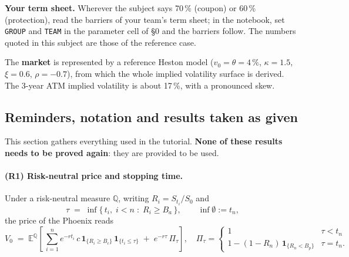 \documentclass[11pt,a4paper]{article}
\newcommand{\E}{\mathbb{E}^{\mathbb{Q}}}
\newcommand{\ind}[1]{\mathbf{1}_{\{#1\}}}
\begin{document}
\noindent\textbf{Your term sheet.} Wherever the subject says 70\,\% (coupon) or 60\,\% (protection), read the barriers
of your team's term sheet; in the notebook, set \texttt{GROUP} and \texttt{TEAM} in the parameter cell of \S0 and the
barriers follow. The numbers quoted in this subject are those of the reference case.

The \textbf{market} is represented by a reference Heston model ($v_0 = \theta = 4\,\%$, $\kappa = 1.5$, $\xi = 0.6$, $\rho = -0.7$),
from which the whole implied volatility surface is derived. The 3-year ATM implied volatility is about
17\,\%, with a pronounced skew.

\subsection{Reminders, notation and results taken as given}

This section gathers everything used in the tutorial. \textbf{None of these results needs to be proved
again}: they are provided to be used.

\paragraph{(R1) Risk-neutral price and stopping time.} Under a risk-neutral measure $\mathbb{Q}$, writing $R_i =
S_{t_i}/S_0$ and
\[
  \tau \;=\; \inf\{\, t_i,\; i<n \;:\; R_i \geq B_a \,\}, \qquad \inf\emptyset := t_n,
\]
the price of the Phoenix reads
\[
  V_0 \;=\; \E\!\left[\, \sum_{i=1}^{n} e^{-r t_i}\, c\, \ind{R_i \geq B_c}\, \ind{t_i \leq \tau} \;+\; e^{-r\tau}\, \Pi_\tau \right],
  \quad
  \Pi_\tau =
  \begin{cases}
    1 & \tau < t_n \\
    1 - (1 - R_n)\,\ind{R_n < B_p} & \tau = t_n.
  \end{cases}
\]
\end{document}
